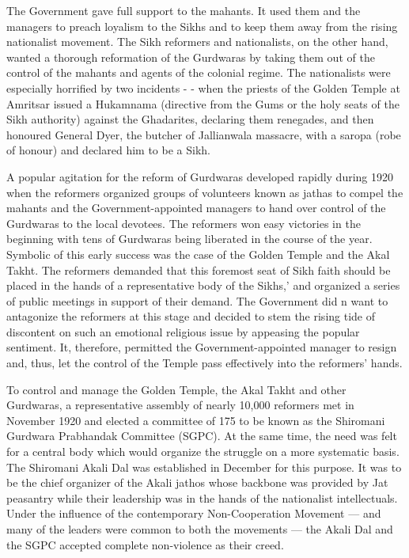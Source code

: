 The Government gave full support to the mahants. It used them and the managers to preach loyalism to the Sikhs and to keep them away from the rising nationalist movement. The Sikh reformers and nationalists, on the other hand, wanted a thorough reformation of the Gurdwaras by taking them out of the control of the mahants and agents of the colonial regime. The nationalists were especially horrified by two incidents - - when the priests of the Golden Temple at Amritsar issued a Hukamnama (directive from the Gums or the holy seats of the Sikh authority) against the Ghadarites, declaring them renegades, and then honoured General Dyer, the butcher of Jallianwala massacre, with a saropa (robe of honour) and declared him to be a Sikh.

A popular agitation for the reform of Gurdwaras developed rapidly during 1920 when the reformers organized groups of volunteers known as jathas to compel the mahants and the Government-appointed managers to hand over control of the Gurdwaras to the local devotees. The reformers won easy victories in the beginning with tens of Gurdwaras being liberated in the course of the year. Symbolic of this early success was the case of the Golden Temple and the Akal Takht. The reformers demanded that this foremost seat of Sikh faith should be placed in the hands of a representative body of the Sikhs,’ and organized a series of public meetings in support of their demand. The Government did n want to antagonize the reformers at this stage and decided to stem the rising tide of discontent on such an emotional religious issue by appeasing the popular sentiment. It, therefore, permitted the Government-appointed manager to resign and, thus, let the control of the Temple pass effectively into the reformers’ hands.

To control and manage the Golden Temple, the Akal Takht and other Gurdwaras, a representative assembly of nearly 10,000 reformers met in November 1920 and elected a committee of 175 to be known as the Shiromani Gurdwara Prabhandak Committee (SGPC). At the same time, the need was felt for a central body which would organize the struggle on a more systematic basis. The Shiromani Akali Dal was established in December for this purpose. It was to be the chief organizer of the Akali jathos whose backbone was provided by Jat peasantry while their leadership was in the hands of the nationalist intellectuals. Under the influence of the contemporary Non-Cooperation Movement — and many of the leaders were common to both the movements — the Akali Dal and the SGPC accepted complete non-violence as their creed.

